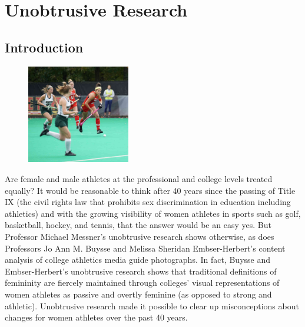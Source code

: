 \chapter{Unobtrusive Research}\label{ch12:unobtrusive}

\section{Introduction}

\begin{figure}
	\centering
	\includegraphics[width=0.4\textwidth]{gfx/12-women_hockey} 
\end{figure}

Are female and male athletes at the professional and college levels treated equally? It would be reasonable to think after 40 years since the passing of Title IX (the civil rights law that prohibits sex discrimination in education including athletics) and with the growing visibility of women athletes in sports such as golf, basketball, hockey, and tennis, that the answer would be an easy yes. But Professor Michael Messner's \cite{messner2002taking} unobtrusive research shows otherwise, as does Professors Jo Ann M. Buysse and Melissa Sheridan Embser-Herbert's \cite{buysse2004constructions} content analysis of college athletics media guide photographs. In fact, Buysse and Embser-Herbert's unobtrusive research shows that traditional definitions of femininity are fiercely maintained through colleges' visual representations of women athletes as passive and overtly feminine (as opposed to strong and athletic). Unobtrusive research made it possible to clear up misconceptions about changes for women athletes over the past 40 years.

